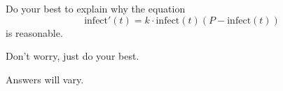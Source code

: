 \documentclass{ximera}
\begin{document}
\begin{problem}
  Do your best to explain why the equation
  \[
  \mathrm{infect}'(t) = k\cdot \mathrm{infect}(t)(P-\mathrm{infect}(t))
  \]
  is reasonable.
  \begin{hint}
    Don't worry, just do your best.
  \end{hint}
  \begin{freeResponse}
    Answers will vary.
  \end{freeResponse}
\end{problem}


\end{document}
